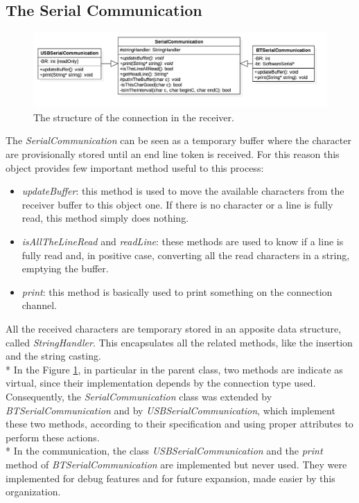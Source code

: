 \subsection{The Serial Communication}
\begin{figure}[h!]
	\centering
	\hspace*{-0.2 \textwidth}\includegraphics[width= 1.4\textwidth]
	{files/images/ArduinoConnection}
	\caption{The structure of the connection in the receiver.}
	\label{fig:connection}
\end{figure}
The \textit{SerialCommunication} can be seen as a temporary buffer where the character are provisionally stored until an end line token is received. For this reason this object provides few important method useful to this process:
\begin{itemize}
	\item \textit{updateBuffer}: this method is used to move the available characters from the receiver buffer to this object one. If there is no character or a line is fully read, this method simply does nothing.
	\item \textit{isAllTheLineRead} and \textit{readLine}: these methods are used to know if a line is fully read and, in positive case, converting all the read characters in a string, emptying the buffer.
	\item \textit{print}: this method is basically used to print something on the connection channel.
\end{itemize}
All the received characters are temporary stored in an apposite data structure, called \textit{StringHandler}. This encapsulates all the related methods, like the insertion and the string casting.\\*
In the Figure \ref{fig:connection}, in particular in the parent class, two methods are indicate as virtual, since their implementation depends by the connection type used. Consequently, the \textit{SerialCommunication} class was extended by \textit{BTSerialCommunication} and by \textit{USBSerialCommunication}, which implement these two methods, according to their specification and using proper attributes to perform these actions.\\*
In the communication, the class \textit{USBSerialCommunication} and the \textit{print} method of \textit{BTSerialCommunication} are implemented but never used. They were implemented for debug features and for future expansion, made easier by this organization.

